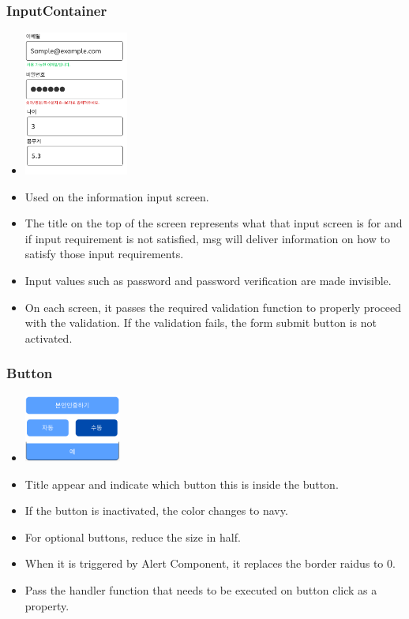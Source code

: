 \documentclass[conference]{IEEEtran}
\begin{document}
\subsubsection{InputContainer}
\begin{itemize}
    \item[] \includegraphics[width=0.27\textwidth]{img/Component/2.png}
    \item Used on the information input screen.
    \item The title on the top of the screen represents what that input screen is for and if input requirement is not satisfied, msg will deliver information on how to satisfy those input requirements.
    \item Input values such as password and password verification are made invisible.
    \item On each screen, it passes the required validation function to properly proceed with the validation. If the validation fails, the form submit button is not activated. \\
\end{itemize}

\newpage

\subsubsection{Button}
\begin{itemize}
    \item[] \includegraphics[width=0.25\textwidth]{img/Component/3.png}
    \item Title appear and indicate which button this is inside the button.
    \item If the button is inactivated, the color changes to navy.
    \item For optional buttons, reduce the size in half.
    \item When it is triggered by Alert Component, it replaces the border raidus to 0.
    \item Pass the handler function that needs to be executed on button click as a property.\\
\end{itemize}
\end{document}
